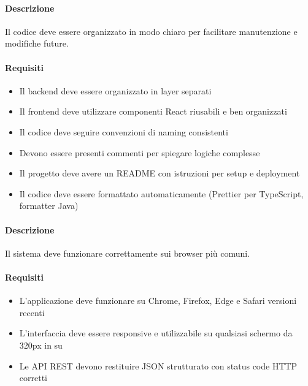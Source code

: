 \begin{reqbox}[title=REQ-NFR-05: Manutenibilità]
\label{subsubsec:req-nfr-maintainability}

\paragraph{Descrizione}
Il codice deve essere organizzato in modo chiaro per facilitare manutenzione e modifiche future.

\paragraph{Requisiti}
\begin{itemize}[leftmargin=1.1em]
\item Il backend deve essere organizzato in layer separati
\item Il frontend deve utilizzare componenti React riusabili e ben organizzati
\item Il codice deve seguire convenzioni di naming consistenti
\item Devono essere presenti commenti per spiegare logiche complesse
\item Il progetto deve avere un README con istruzioni per setup e deployment
\item Il codice deve essere formattato automaticamente (Prettier per TypeScript, formatter Java)
\end{itemize}

\end{reqbox}

\vspace{0.5cm}

\newpage


\begin{reqbox}[title=REQ-NFR-06: Compatibilità]
\label{subsubsec:req-nfr-compatibility}

\paragraph{Descrizione}
Il sistema deve funzionare correttamente sui browser più comuni.

\paragraph{Requisiti}
\begin{itemize}[leftmargin=1.1em]
\item L'applicazione deve funzionare su Chrome, Firefox, Edge e Safari versioni recenti
\item L'interfaccia deve essere responsive e utilizzabile su qualsiasi schermo da 320px in su
\item Le API REST devono restituire JSON strutturato con status code HTTP corretti
\end{itemize}

\end{reqbox}

